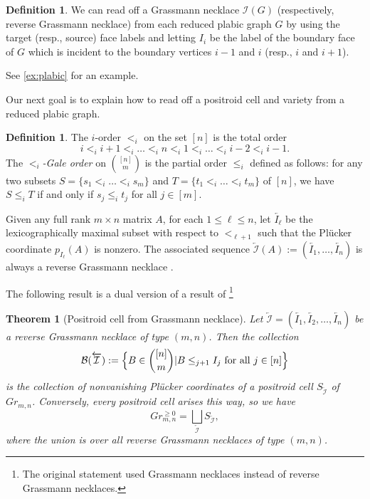 \documentclass{amsart}
\newtheorem{theorem}[thm]{Theorem}
\theoremstyle{definition}
\newtheorem{definition}[thm]{Definition}
\numberwithin{equation}{section}
\begin{document}
\begin{definition}\label{neckfromG}
We can read off a Grassmann necklace $\mathcal{I}(G)$ 
(respectively, reverse Grassmann necklace)
from each reduced plabic graph $G$
by using the target (resp., source)
face labels and letting $I_i$ be the label of the 
boundary face of $G$ which is incident to the boundary vertices $i-1$
and $i$ (resp., $i$ and $i+1$).
\end{definition}
See \cref{ex:plabic} for an example.



Our next goal is to explain how to read off a positroid cell and variety
from a reduced plabic graph.
\begin{definition}
The $i$-order $<_i$ on the set $[n]$ is the total order
$$i<_i i+1 <_i \dots <_i n <_i 1 <_i \dots <_i i-2 <_i i-1.$$
The \emph{$<_i$-Gale order} on ${[n] \choose m}$
	is the partial order $\leq_i$
defined as follows: 
for any two subsets $S=\{s_1 <_i \dots <_i s_m\}$
and $T = \{t_1 <_i \dots <_i t_m\}$ of $[n]$, we have
$S \leq_i T$ if and only if $s_j \leq_i t_j$
for all $j\in [m]$.
\end{definition}

Given any full rank $m \times n$ matrix $A$, for each $1\leq \ell \leq n$,
 let $\overleftarrow{I_{\ell}}$ be the lexicographically maximal subset with respect to 
$<_{\ell+1}$ such that 
the Pl\"ucker coordinate $p_{I_{\ell}}(A)$
is nonzero.  
The associated sequence
$\overleftarrow{\mathcal{I}}(A):=(\overleftarrow{I_1},\dots,\overleftarrow{I_n})$ is always a reverse Grassmann
necklace  \cite[Lemma 16.3]{Postnikov}.

The following result is a dual version of a result of \cite{Postnikov,oh}\footnote{The original
statement used Grassmann necklaces instead of reverse Grassmann necklaces.}
\begin{theorem}[Positroid cell from Grassmann necklace]\cite{Postnikov, oh}
	Let $\overleftarrow{\mathcal{I}}= (\overleftarrow{I_1},\overleftarrow{I_2},\dots,\overleftarrow{I_n})$ 
be a reverse Grassmann necklace of type $(m,n)$.
Then the collection
	$$\mathcal{B}(\overleftarrow{\mathcal{I}}):=
	\Bigl\{ B\in {[n] \choose m} \vert B \leq_{j+1} I_j
\text{ for all }j\in [n]\Bigr\}$$
is the collection of nonvanishing Pl\"ucker coordinates
	of a positroid cell $S_{\overleftarrow{\mathcal{I}}}$ of $Gr_{m,n}$.
Conversely, every positroid cell arises this way, so we have
	$$Gr_{m,n}^{\geq 0} = \bigsqcup_{\overleftarrow{\mathcal{I}}} S_{\overleftarrow{\mathcal{I}}},$$
	where the union is over all reverse Grassmann necklaces of type
	$(m,n)$.
\end{theorem}
\end{document}
